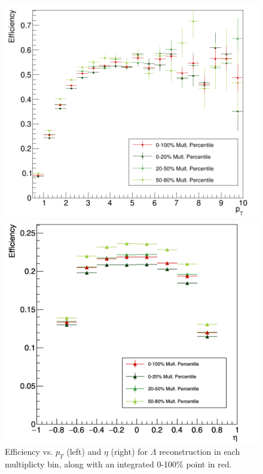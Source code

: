 \begin{figure}[h]
	\centering
	\begin{minipage}{0.48\textwidth}
		\includegraphics[width=\textwidth]{figures/analysis/v0_efficiency_pt.png}
	\end{minipage}
	\begin{minipage}{0.48\textwidth}
		\includegraphics[width=\textwidth]{figures/analysis/v0_efficiency_eta.png}
	\end{minipage}
	\caption{Efficiency vs. $p_T$ (left) and $\eta$ (right) for $\Lambda$ reconstruction in each multiplicty bin, along with an integrated 0-100\% point in red.}
	\label{fig:lambda_eff}
\end{figure}


